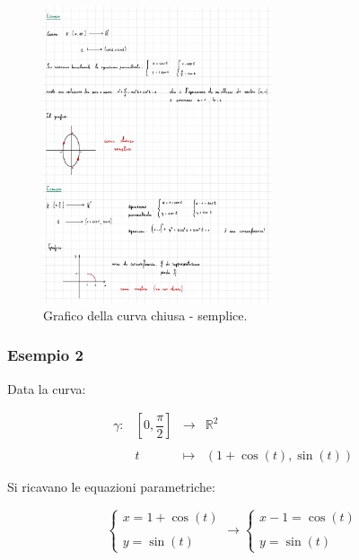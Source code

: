 \documentclass[a4paper]{article}
\begin{document}
	\begin{figure}[!htp]
		\centering
		\includegraphics[width=0.6\textwidth]{img/curva_chiusa_semplice_ex1.pdf}
		\caption{Grafico della curva chiusa - semplice.}
	\end{figure}

	\newpage
	
	\subsubsection[Esempio 2]{\textcolor{Green4}{Esempio 2}}
	
	Data la curva:
	
	\begin{equation*}
		\begin{array}{llll}
			\gamma:	& \left[0,\dfrac{\pi}{2}\right]	& \longrightarrow	& \mathbb{R}^{2} \\
			&&& \\
			& t						& \longmapsto		& \left(1 + \cos\left(t\right), \sin\left(t\right)\right)
		\end{array}
	\end{equation*}
	
	\noindent
	Si ricavano le equazioni parametriche:
	
	\begin{equation*}
		\begin{cases}
			x = 1 + \cos\left(t\right) \\
			\\
			y = \sin\left(t\right)
		\end{cases}
		\longrightarrow
		\begin{cases}
			x - 1 = \cos\left(t\right) \\
			\\
			y = \sin\left(t\right)
		\end{cases}
	\end{equation*}
	
\end{document}
